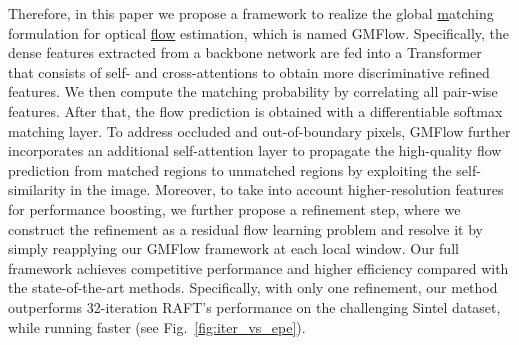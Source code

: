 \documentclass[10pt,twocolumn,letterpaper]{article}
\begin{document}
Therefore, in this paper we propose a framework to realize the \underline{g}lobal \underline{m}atching formulation for optical \underline{flow} estimation, which is named GMFlow. Specifically, the dense features extracted from a backbone network are fed into a Transformer that consists of self- and cross-attentions to obtain more discriminative refined features. We then compute the matching probability by correlating all pair-wise features.
After that, the flow prediction is  obtained with a differentiable softmax matching layer. %
To address occluded and out-of-boundary pixels, %
GMFlow further incorporates an additional self-attention layer to propagate the high-quality flow prediction from matched %
regions to unmatched regions %
by exploiting the self-similarity in the image. %
Moreover, to take into account higher-resolution features for performance boosting, we further propose a refinement step, where we construct the refinement as a residual flow learning problem and resolve it by simply reapplying our GMFlow framework at each local window. Our full framework achieves competitive performance and higher efficiency compared with the state-of-the-art methods. Specifically, with only one refinement, our method outperforms 32-iteration RAFT's performance on the challenging Sintel dataset, while running faster (see Fig.~\ref{fig:iter_vs_epe}).
\end{document}
